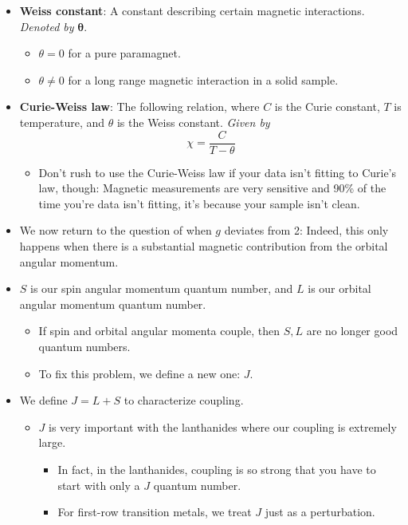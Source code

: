 \documentclass[../notes.tex]{subfiles}
\begin{document}
\begin{itemize}
    \item \textbf{Weiss constant}: A constant describing certain magnetic interactions. \emph{Denoted by} $\bm{\theta}$.
    \begin{itemize}
        \item $\theta=0$ for a pure paramagnet.
        \item $\theta\neq 0$ for a long range magnetic interaction in a solid sample.
    \end{itemize}
    \item \textbf{Curie-Weiss law}: The following relation, where $C$ is the Curie constant, $T$ is temperature, and $\theta$ is the Weiss constant. \emph{Given by}
    \begin{equation*}
        \chi = \frac{C}{T-\theta}
    \end{equation*}
    \begin{itemize}
        \item Don't rush to use the Curie-Weiss law if your data isn't fitting to Curie's law, though: Magnetic measurements are very sensitive and 90\% of the time you're data isn't fitting, it's because your sample isn't clean.
    \end{itemize}
    \item We now return to the question of when $g$ deviates from 2: Indeed, this only happens when there is a substantial magnetic contribution from the orbital angular momentum.
    \item $S$ is our spin angular momentum quantum number, and $L$ is our orbital angular momentum quantum number.
    \begin{itemize}
        \item If spin and orbital angular momenta couple, then $S,L$ are no longer good quantum numbers.
        \item To fix this problem, we define a new one: $J$.
    \end{itemize}
    \item We define $J=L+S$ to characterize coupling.
    \begin{itemize}
        \item $J$ is very important with the lanthanides where our coupling is extremely large.
        \begin{itemize}
            \item In fact, in the lanthanides, coupling is so strong that you have to start with only a $J$ quantum number.
            \item For first-row transition metals, we treat $J$ just as a perturbation.

\end{itemize}
\end{itemize}
\end{itemize}
\end{document}
